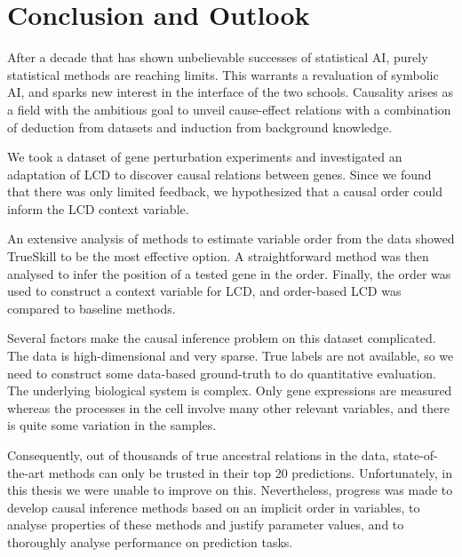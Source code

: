 \newpage
\section{Conclusion and Outlook}
\label{chapter:conclusion}




After a decade that has shown unbelievable successes of statistical AI, purely statistical methods are reaching limits. This warrants a revaluation of symbolic AI, and sparks new interest in the interface of the two schools. Causality arises as a field with the ambitious goal to unveil cause-effect relations with a combination of deduction from datasets and induction from background knowledge. 

We took a dataset of gene perturbation experiments and investigated an adaptation of LCD to discover causal relations between genes. Since we found that there was only limited feedback, we hypothesized that a causal order could inform the LCD context variable. 

An extensive analysis of methods to estimate variable order from the data showed TrueSkill to be the most effective option. A straightforward method was then analysed to infer the position of a tested gene in the order. Finally, the order was used to construct a context variable for LCD, and order-based LCD was compared to baseline methods.

Several factors make the causal inference problem on this dataset complicated. The data is high-dimensional and very sparse. True labels are not available, so we need to construct some data-based ground-truth to do quantitative evaluation. The underlying biological system is complex. Only gene expressions are measured whereas the processes in the cell involve many other relevant variables, and there is quite some variation in the samples. 

Consequently, out of thousands of true ancestral relations in the data, state-of-the-art methods can only be trusted in their top 20 predictions. Unfortunately, in this thesis we were unable to improve on this. Nevertheless, progress was made to develop causal inference methods based on an implicit order in variables, to analyse properties of these methods and justify parameter values, and to thoroughly analyse performance on prediction tasks.


